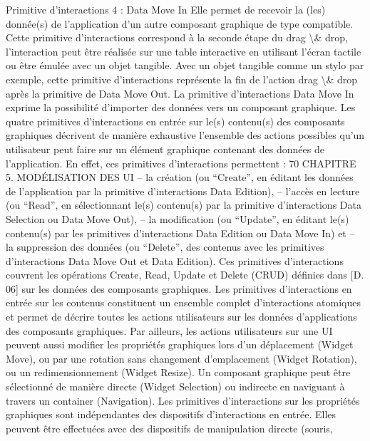 \documentclass{article}
\begin{document}
Primitive d’interactions 4 : Data Move In
Elle permet de recevoir la (les) donn\'{e}e(s) de l’application d’un autre composant graphique de type compatible.
Cette primitive d’interactions correspond \`{a} la seconde \'{e}tape du drag \textbackslash{}& drop, l’interaction peut \^{e}tre
r\'{e}alis\'{e}e sur une table interactive en utilisant l’\'{e}cran tactile ou \^{e}tre \'{e}mul\'{e}e avec un objet tangible.
Avec un objet tangible comme un stylo par exemple, cette primitive d’interactions repr\'{e}sente la ﬁn de
l’action drag \textbackslash{}& drop apr\`{e}s la primitive de Data Move Out. La primitive d’interactions Data Move
In exprime la possibilit\'{e} d’importer des donn\'{e}es vers un composant graphique.
Les quatre primitives d’interactions en entr\'{e}e sur le(s) contenu(s) des composants graphiques d\'{e}crivent de mani\`{e}re exhaustive l’ensemble des actions possibles qu’un utilisateur peut faire sur un
\'{e}l\'{e}ment graphique contenant des donn\'{e}es de l’application. En effet, ces primitives d’interactions permettent :
70
CHAPITRE 5. MODÉLISATION DES UI
– la cr\'{e}ation (ou “Create”, en \'{e}ditant les donn\'{e}es de l’application par la primitive d’interactions
Data Edition),
– l’acc\`{e}s en lecture (ou “Read”, en s\'{e}lectionnant le(s) contenu(s) par la primitive d’interactions
Data Selection ou Data Move Out),
– la modiﬁcation (ou “Update”, en \'{e}ditant le(s) contenu(s) par les primitives d’interactions Data
Edition ou Data Move In) et
– la suppression des donn\'{e}es (ou “Delete”, des contenus avec les primitives d’interactions Data
Move Out et Data Edition).
Ces primitives d’interactions couvrent les op\'{e}rations Create, Read, Update et Delete (CRUD) d\'{e}ﬁnies
dans [D. 06] sur les donn\'{e}es des composants graphiques. Les primitives d’interactions en entr\'{e}e sur
les contenus constituent un ensemble complet d’interactions atomiques et permet de d\'{e}crire toutes les
actions utilisateurs sur les donn\'{e}es d’applications des composants graphiques.
Par ailleurs, les actions utilisateurs sur une UI peuvent aussi modiﬁer les propri\'{e}t\'{e}s graphiques
lors d’un d\'{e}placement (Widget Move), ou par une rotation sans changement d’emplacement (Widget
Rotation), ou un redimensionnement (Widget Resize). Un composant graphique peut \^{e}tre s\'{e}lectionn\'{e}
de mani\`{e}re directe (Widget Selection) ou indirecte en naviguant \`{a} travers un container (Navigation).
Les primitives d’interactions sur les propri\'{e}t\'{e}s graphiques sont ind\'{e}pendantes des dispositifs d’interactions en entr\'{e}e. Elles peuvent \^{e}tre effectu\'{e}es avec des dispositifs de manipulation directe (souris,
\end{document}
